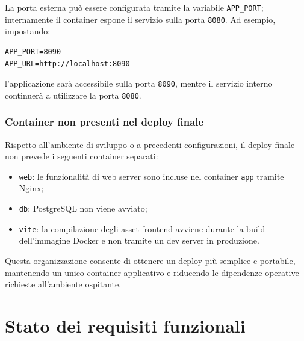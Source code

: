 \documentclass[a4paper,10pt]{article}
\begin{document}
La porta esterna può essere configurata tramite la variabile \texttt{APP\_PORT}; internamente il container espone il servizio sulla porta \texttt{8080}. Ad esempio, impostando:

\begin{lstlisting}
APP_PORT=8090
APP_URL=http://localhost:8090
\end{lstlisting}

l'applicazione sarà accessibile sulla porta \texttt{8090}, mentre il servizio interno continuerà a utilizzare la porta \texttt{8080}.

\subsubsection{Container non presenti nel deploy finale}
Rispetto all'ambiente di sviluppo o a precedenti configurazioni, il deploy finale non prevede i seguenti container separati:

\begin{itemize}
    \item \texttt{web}: le funzionalità di web server sono incluse nel container \texttt{app} tramite Nginx;
    \item \texttt{db}: PostgreSQL non viene avviato;
    \item \texttt{vite}: la compilazione degli asset frontend avviene durante la build dell'immagine Docker e non tramite un dev server in produzione.
\end{itemize}

Questa organizzazione consente di ottenere un deploy più semplice e portabile, mantenendo un unico container applicativo e riducendo le dipendenze operative richieste all'ambiente ospitante.

\newpage



\newcommand{\reqF}[2]{%
    \refstepcounter{RF@#1}%
    \stepcounter{reqTotal}%
    \noindent{RF-#1-\arabic{RF@#1}}\quad #2\par
}


\section{Stato dei requisiti funzionali}
    
\end{document}
